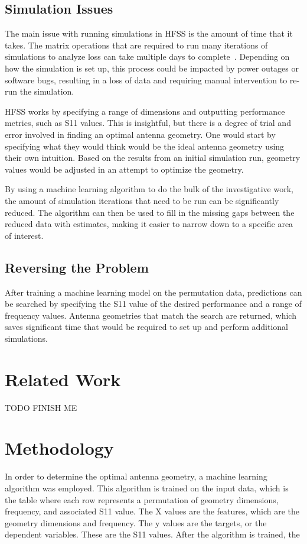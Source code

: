 \documentclass[lettersize,journal]{IEEEtran}
\begin{document}
\subsection{Simulation Issues}
The main issue with running simulations in HFSS is the amount of time that it takes. The matrix operations that are required to run many iterations of simulations to analyze loss can take multiple days to complete~\cite{john_antenna_2009}. Depending on how the simulation is set up, this process could be impacted by power outages or software bugs, resulting in a loss of data and requiring manual intervention to re-run the simulation. 

HFSS works by specifying a range of dimensions and outputting performance metrics, such as S11 values. This is insightful, but there is a degree of trial and error involved in finding an optimal antenna geometry. One would start by specifying what they would think would be the ideal antenna geometry using their own intuition. Based on the results from an initial simulation run, geometry values would be adjusted in an attempt to optimize the geometry.

By using a machine learning algorithm to do the bulk of the investigative work, the amount of simulation iterations that need to be run can be significantly reduced. The algorithm can then be used to fill in the missing gaps between the reduced data with estimates, making it easier to narrow down to a specific area of interest. 

\subsection{Reversing the Problem}
After training a machine learning model on the permutation data, predictions can be searched by specifying the S11 value of the desired performance and a range of frequency values. Antenna geometries that match the search are returned, which saves significant time that would be required to set up and perform additional simulations.  

\section{Related Work}
TODO FINISH ME


\section{Methodology}
In order to determine the optimal antenna geometry, a machine learning algorithm was employed. This algorithm is trained on the input data, which is the table where each row represents a permutation of geometry dimensions, frequency, and associated S11 value. The X values are the features, which are the geometry dimensions and frequency. The y values are the targets, or the dependent variables. These are the S11 values. After the algorithm is trained, the 
\end{document}
